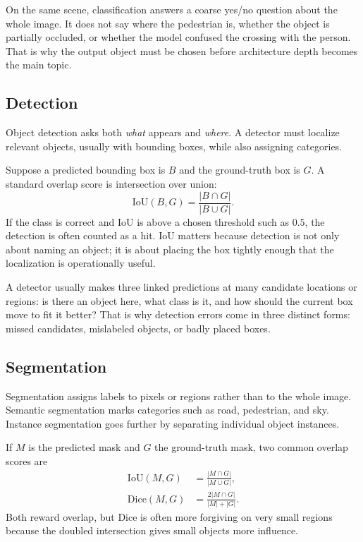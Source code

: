 On the same scene, classification answers a coarse yes/no question about the whole image. It does not say where the pedestrian is, whether the object is partially occluded, or whether the model confused the crossing with the person. That is why the output object must be chosen before architecture depth becomes the main topic.

\subsection{Detection}

Object detection asks both \emph{what} appears and \emph{where}. A detector must localize relevant objects, usually with bounding boxes, while also assigning categories.

\begin{mathlens}
Suppose a predicted bounding box is \(B\) and the ground-truth box is \(G\). A standard overlap score is intersection over union:
\[
\mathrm{IoU}(B,G)=\frac{|B\cap G|}{|B\cup G|}.
\]
If the class is correct and IoU is above a chosen threshold such as \(0.5\), the detection is often counted as a hit. IoU matters because detection is not only about naming an object; it is about placing the box tightly enough that the localization is operationally useful.
\end{mathlens}

\begin{practicalnote}
A detector usually makes three linked predictions at many candidate locations or regions: is there an object here, what class is it, and how should the current box move to fit it better? That is why detection errors come in three distinct forms: missed candidates, mislabeled objects, or badly placed boxes.
\end{practicalnote}

\subsection{Segmentation}

Segmentation assigns labels to pixels or regions rather than to the whole image. Semantic segmentation marks categories such as road, pedestrian, and sky. Instance segmentation goes further by separating individual object instances.

\begin{mathlens}
If \(M\) is the predicted mask and \(G\) the ground-truth mask, two common overlap scores are
\[
\begin{aligned}
\mathrm{IoU}(M,G) &= \frac{|M\cap G|}{|M\cup G|}, \\
\mathrm{Dice}(M,G) &= \frac{2|M\cap G|}{|M|+|G|}.
\end{aligned}
\]
Both reward overlap, but Dice is often more forgiving on very small regions because the doubled intersection gives small objects more influence.
\end{mathlens}

